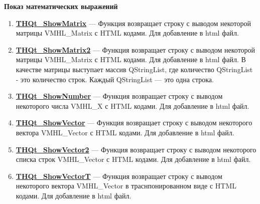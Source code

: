 \documentclass[a4paper,12pt]{article}
\begin{document}
\textbf{Показ математических выражений}
\begin{enumerate}

\item \textbf{\hyperref[THQt_ShowMatrix]{THQt\_ShowMatrix}} --- Функция возвращает строку с выводом некоторой матрицы VMHL\_Matrix с HTML кодами. Для добавление в html файл.

\item \textbf{\hyperref[THQt_ShowMatrix2]{THQt\_ShowMatrix2}} --- Функция возвращает строку с выводом некоторой матрицы VMHL\_Matrix с HTML кодами. Для добавление в html файл. В качестве матрицы выступает массив QStringList, где количество QStringList - это количество строк. Каждый QStringList --- это одна строка.

\item \textbf{\hyperref[THQt_ShowNumber]{THQt\_ShowNumber}} --- Функция возвращает строку с выводом некоторого числа VMHL\_X с HTML кодами. Для добавление в html файл.

\item \textbf{\hyperref[THQt_ShowVector]{THQt\_ShowVector}} --- Функция возвращает строку с выводом некоторого вектора VMHL\_Vector с HTML кодами. Для добавление в html файл.

\item \textbf{\hyperref[THQt_ShowVector2]{THQt\_ShowVector2}} --- Функция возвращает строку с выводом некоторого списка строк VMHL\_Vector с HTML кодами. Для добавление в html файл.

\item \textbf{\hyperref[THQt_ShowVectorT]{THQt\_ShowVectorT}} --- Функция возвращает строку с выводом некоторого вектора VMHL\_Vector в траснпонированном виде с HTML кодами. Для добавление в html файл.

\end{enumerate}
\end{document}
